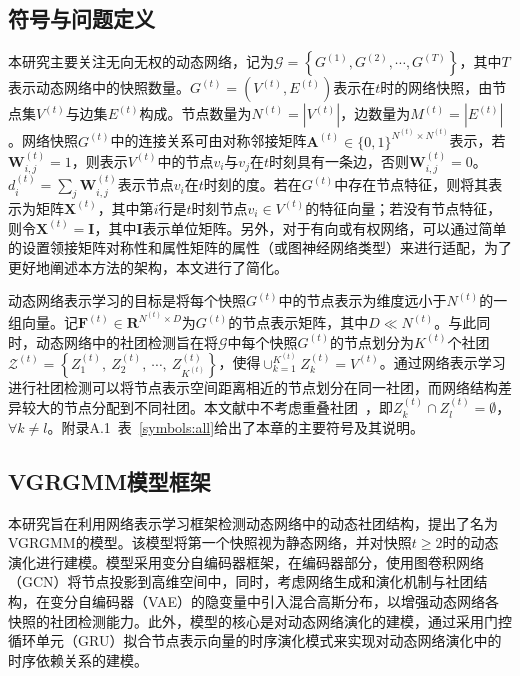 \subsection{符号与问题定义}
本研究主要关注无向无权的动态网络，记为$\mathcal{G}=\left\{G^{(1)},G^{(2)},\cdots,G^{(T)}\right\}$，其中$T$表示动态网络中的快照数量。$G^{(t)} = (V^{(t)}, E^{(t)})$表示在$t$时的网络快照，由节点集$V^{(t)}$与边集$E^{(t)}$构成。节点数量为$N^{(t)} = |V^{(t)}|$，边数量为$M^{(t)} = |E^{(t)}|$。网络快照$G^{(t)}$中的连接关系可由对称邻接矩阵$\mathbf{A}^{(t)} \in \{0,1\}^{N^{(t)}\times N^{(t)}}$表示，若$\mathbf{W}_{i,j}^{(t)} = 1$，则表示$V^{(t)}$中的节点$v_i$与$v_j$在$t$时刻具有一条边，否则$\mathbf{W}_{i,j}^{(t)} = 0$。$d^{(t)}_i = \sum_{j}\mathbf{W}_{i,j}^{(t)}$表示节点$v_i$在$t$时刻的度。若在$G^{(t)}$中存在节点特征，则将其表示为矩阵$\mathbf{X}^{(t)}$，其中第$i$行是$t$时刻节点$v_i \in V^{(t)}$的特征向量；若没有节点特征，则令$\mathbf{X}^{(t)} = \mathbf{I}$，其中$\mathbf{I}$表示单位矩阵。另外，对于有向或有权网络，可以通过简单的设置领接矩阵对称性和属性矩阵的属性（或图神经网络类型）来进行适配，为了更好地阐述本方法的架构，本文进行了简化。

动态网络表示学习的目标是将每个快照$G^{(t)}$中的节点表示为维度远小于$N^{(t)}$的一组向量。记$\mathbf{F}^{(t)} \in \boldsymbol{R}^{N^{(t)}\times D}$为$G^{(t)}$的节点表示矩阵，其中$D \ll N^{(t)}$。与此同时，动态网络中的社团检测旨在将$\mathcal{G}$中每个快照$G^{(t)}$的节点划分为$K^{(t)}$个社团$\mathcal{Z}^{(t)} = \left\{Z_{1}^{(t)},\ Z_{2}^{(t)},\ \cdots,\ Z_{K^{(t)}}^{(t)} \right\}$，使得$\cup_{k=1}^{K^{(t)}} Z_{k}^{(t)} = V^{(t)}$。通过网络表示学习进行社团检测可以将节点表示空间距离相近的节点划分在同一社团，而网络结构差异较大的节点分配到不同社团。本文献中不考虑重叠社团~\cite{yang2014overlapping}，即$Z_{k}^{(t)} \cap Z_{l}^{(t)} = \emptyset$，$\forall k \neq l$。附录A.1~表~\ref{symbols:all}给出了本章的主要符号及其说明。

\subsection{VGRGMM模型框架}

本研究旨在利用网络表示学习框架检测动态网络中的动态社团结构，提出了名为VGRGMM的模型。该模型将第一个快照视为静态网络，并对快照$t \ge 2$时的动态演化进行建模。模型采用变分自编码器框架，在编码器部分，使用图卷积网络（GCN）\cite{Kipf.2017.Welling}将节点投影到高维空间中，同时，考虑网络生成和演化机制与社团结构，在变分自编码器（VAE）\cite{kingma2013auto}的隐变量中引入混合高斯分布，以增强动态网络各快照的社团检测能力。此外，模型的核心是对动态网络演化的建模，通过采用门控循环单元（GRU）拟合节点表示向量的时序演化模式来实现对动态网络演化中的时序依赖关系的建模。
 

